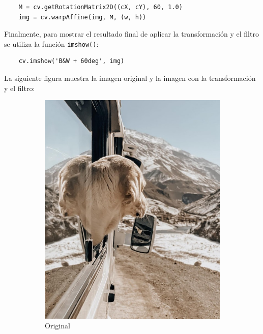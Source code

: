 \documentclass[a4paper, 12pt]{article}
\begin{document}
\begin{lstlisting}
    M = cv.getRotationMatrix2D((cX, cY), 60, 1.0)
    img = cv.warpAffine(img, M, (w, h))
\end{lstlisting}

Finalmente, para mostrar el resultado final de aplicar la transformación y el filtro se utiliza la función \lstinline{imshow()}:

\begin{lstlisting}
    cv.imshow('B&W + 60deg', img)
\end{lstlisting}

La siguiente figura muestra la imagen original y la imagen con la transformación y el filtro:

\begin{figure}[!ht]
    \centering
    \begin{subfigure}[b]{0.3\textwidth}
        \includegraphics[width=\textwidth]{img/dog.jpg}
        \caption{Original}
        \label{fig:imagen-original}
    \end{subfigure}
    \hfill
    \begin{subfigure}[b]{0.3\textwidth}

\end{subfigure}
\end{figure}
\end{document}
